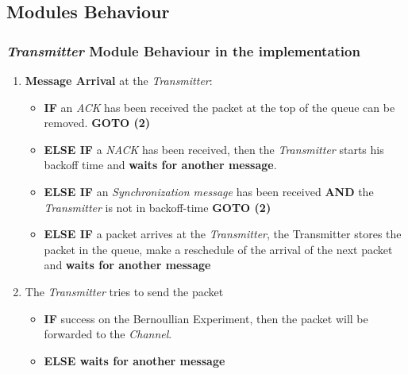 \subsection{Modules Behaviour}
\subsubsection{\textit{Transmitter} Module Behaviour in the implementation}
\begin{enumerate}
	\item \textbf{Message Arrival} at the \textit{Transmitter}:
	\begin{itemize}
		\item \textbf{IF} an \textit{ACK} has been received the packet at the top of the queue can be removed. \textbf{GOTO (2)}
		\item \textbf{ELSE IF} a \textit{NACK} has been received, then the \textit{Transmitter} starts his backoff time and \textbf{waits for another message}.
		\item \textbf{ELSE IF} an \textit{Synchronization message} has been received \textbf{AND} the \textit{Transmitter} is not in backoff-time \textbf{GOTO (2)}
		\item \textbf{ELSE IF} a packet arrives at the \textit{Transmitter}, the Transmitter stores the packet in the queue, make a reschedule of the arrival of the next packet and \textbf{waits for another message}
	\end{itemize}
	\item The \textit{Transmitter} tries to send the packet
	\begin{itemize}
		\item \textbf{IF} success on the Bernoullian Experiment, then the packet will be forwarded to the \textit{Channel}.
		\item \textbf{ELSE waits for another message}
	\end{itemize}
\end{enumerate}
